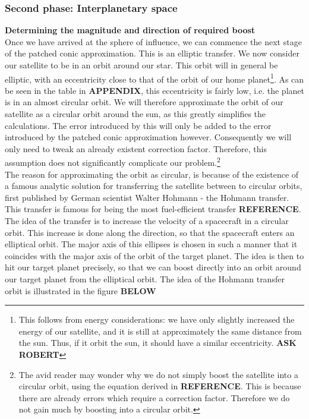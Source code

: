 \documentclass[a4paper,10pt,english]{article}
\begin{document}
\subsubsection{Second phase: Interplanetary space}
\textbf{Determining the magnitude and direction of required boost}\\
Once we have arrived at the sphere of influence, we can commence the next stage of the patched conic approximation. This is an elliptic transfer. We now consider our satellite to be in an orbit around our star. This orbit will in general be elliptic, with an eccentricity close to that of the orbit of our home planet\footnote{This follows from energy considerations: we have only slightly increased the energy of our satellite, and it is still at approximately the same distance from the sun. Thus, if it orbit the sun, it should have a similar eccentricity. \textbf{ASK ROBERT}}. As can be seen in the table in \textbf{APPENDIX}, this eccentricity is fairly low, i.e. the planet is in an almost circular orbit. We will therefore approximate the orbit of our satellite as a circular orbit around the sun, as this greatly simplifies the calculations. The error introduced by this will only be added to the error introduced by the patched conic approximation however. Consequently we will only need to tweak an already existent correction factor. Therefore, this assumption does not significantly complicate our problem.\footnote{The avid reader may wonder why we do not simply boost the satellite into a circular orbit, using the equation derived in \textbf{REFERENCE}. This is because there are already errors which require a correction factor. Therefore we do not gain much by boosting into a circular orbit.}\\
\linebreak
The reason for approximating the orbit as circular, is because of the existence of a famous analytic solution for transferring the satellite between to circular orbits, first published by German scientist Walter Hohmann - the Hohmann transfer. This transfer is famous for being the most fuel-efficient transfer \textbf{REFERENCE}. The idea of the transfer is to increase the velocity of a spacecraft in a circular orbit. This increase is done along the direction, so that the spacecraft enters an elliptical orbit. The major axis of this ellipses is chosen in such a manner that it coincides with the major axis of the orbit of  the target planet. The idea is then to hit our target planet precisely, so that we can boost directly into an orbit around our target planet from the elliptical orbit. The idea of the Hohmann transfer orbit is illustrated in the figure \textbf{BELOW}\\
\end{document}

